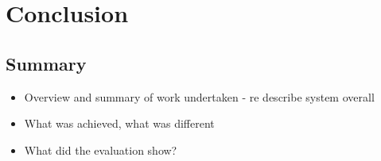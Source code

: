 \documentclass[12pt,twoside,notitlepage]{report}
\begin{document}














\cleardoublepage
\chapter{Conclusion}
  \section{Summary}
        \begin{itemize}
            \item Overview and summary of work undertaken - re describe system overall
            \item What was achieved, what was different
            \item What did the evaluation show?
        \end{itemize}
\end{document}
